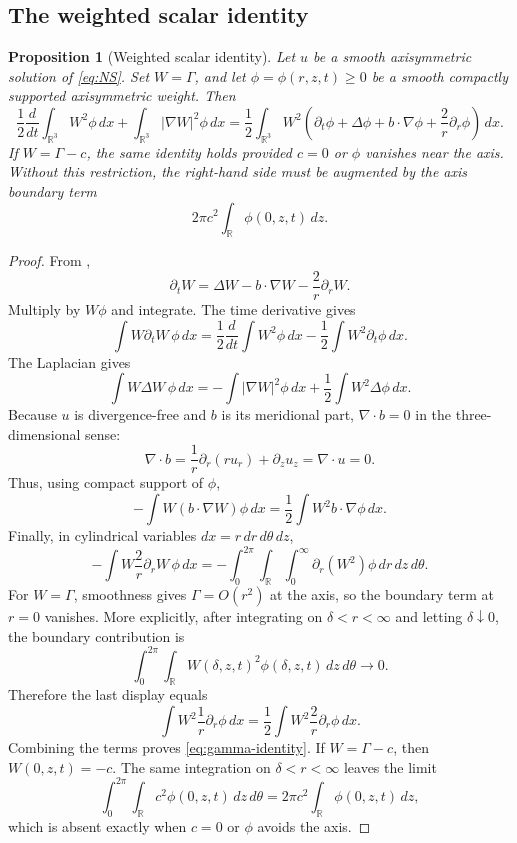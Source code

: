 \documentclass[11pt]{amsart}
\theoremstyle{plain}
\newtheorem{proposition}[theorem]{Proposition}
\theoremstyle{definition}
\theoremstyle{remark}
\numberwithin{equation}{section}
\begin{document}
\subsection{The weighted scalar identity}

\begin{proposition}[Weighted scalar identity]\label{prop:gamma-identity}
Let \(u\) be a smooth axisymmetric solution of \eqref{eq:NS}.  Set
\(W=\Gamma\), and let \(\phi=\phi(r,z,t)\ge0\) be a smooth compactly supported
axisymmetric weight.  Then
\begin{equation}\label{eq:gamma-identity}
   \frac12\frac{d}{dt}\int_{\mathbb R^3}W^2\phi\,dx
   +
   \int_{\mathbb R^3}|\nabla W|^2\phi\,dx
   =
   \frac12\int_{\mathbb R^3}W^2
   \left(
      \partial_t\phi+\Delta\phi+b\cdot\nabla\phi+\frac2r\partial_r\phi
   \right)\,dx .
\end{equation}
If \(W=\Gamma-c\), the same identity holds provided \(c=0\) or \(\phi\)
vanishes near the axis.  Without this restriction, the right-hand side must be
augmented by the axis boundary term
\[
   2\pi c^2\int_{\mathbb R}\phi(0,z,t)\,dz .
\]
\end{proposition}

\begin{proof}
From ,
\[
   \partial_tW
   =
   \Delta W-b\cdot\nabla W-\frac2r\partial_rW .
\]
Multiply by \(W\phi\) and integrate.  The time derivative gives
\[
   \int W\partial_tW\,\phi\,dx
   =
   \frac12\frac{d}{dt}\int W^2\phi\,dx
   -
   \frac12\int W^2\partial_t\phi\,dx .
\]
The Laplacian gives
\[
   \int W\Delta W\,\phi\,dx
   =
   -\int|\nabla W|^2\phi\,dx
   +
   \frac12\int W^2\Delta\phi\,dx .
\]
Because \(u\) is divergence-free and \(b\) is its meridional part,
\(\nabla\cdot b=0\) in the three-dimensional sense:
\[
   \nabla\cdot b
   =
   \frac1r\partial_r(ru_r)+\partial_zu_z
   =
   \nabla\cdot u
   =
   0.
\]
Thus, using compact support of \(\phi\),
\[
   -\int W(b\cdot\nabla W)\phi\,dx
   =
   \frac12\int W^2 b\cdot\nabla\phi\,dx .
\]
Finally, in cylindrical variables \(dx=r\,dr\,d\theta\,dz\),
\[
   -\int W\frac2r\partial_rW\,\phi\,dx
   =
   -\int_0^{2\pi}\int_{\mathbb R}\int_0^\infty
      \partial_r(W^2)\phi\,dr\,dz\,d\theta .
\]
For \(W=\Gamma\), smoothness gives \(\Gamma=O(r^2)\) at the axis, so the
boundary term at \(r=0\) vanishes.  More explicitly, after integrating on
\(\delta<r<\infty\) and letting \(\delta\downarrow0\), the boundary
contribution is
\[
   \int_0^{2\pi}\int_{\mathbb R}W(\delta,z,t)^2\phi(\delta,z,t)\,dz\,d\theta
   \longrightarrow0 .
\]
Therefore the last display equals
\[
   \int W^2\frac1r\partial_r\phi\,dx
   =
   \frac12\int W^2\frac2r\partial_r\phi\,dx .
\]
Combining the terms proves \eqref{eq:gamma-identity}.  If \(W=\Gamma-c\),
then \(W(0,z,t)=-c\).  The same integration on \(\delta<r<\infty\) leaves the
limit
\[
   \int_0^{2\pi}\int_{\mathbb R}c^2\phi(0,z,t)\,dz\,d\theta
   =
   2\pi c^2\int_{\mathbb R}\phi(0,z,t)\,dz ,
\]
which is absent exactly when \(c=0\) or \(\phi\) avoids the axis.
\end{proof}
\end{document}

